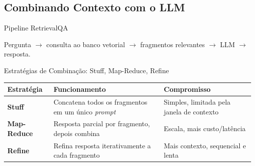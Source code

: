 \documentclass[aspectratio=169]{beamer}
\begin{document}
\subsection{Combinando Contexto com o LLM}

\begin{frame}{Pipeline RetrievalQA}
    \centering
    \begin{block}{}
        \centering\footnotesize Pergunta $\to$ consulta ao banco vetorial $\to$ fragmentos relevantes $\to$ LLM $\to$ resposta.
    \end{block}
\end{frame}

\begin{frame}[shrink=5]{Estratégias de Combinação: Stuff, Map-Reduce, Refine}
    \begin{center}\footnotesize
    \begin{tabular}{>{\bfseries}p{2.0cm}p{6.6cm}p{2.8cm}}
    \toprule
    Estratégia & Funcionamento & Compromisso \\
    \midrule
    Stuff & Concatena todos os fragmentos em um único \textit{prompt} & Simples, limitada pela janela de contexto \\
    Map-Reduce & Resposta parcial por fragmento, depois combina & Escala, mais custo/latência \\
    Refine & Refina resposta iterativamente a cada fragmento & Mais contexto, sequencial e lenta \\
    \bottomrule
    \end{tabular}
    \end{center}
\end{frame}
\end{document}
